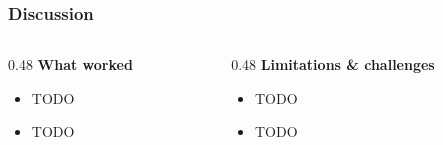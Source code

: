
\begin{frame}
	\frametitle{Discussion}

	\begin{columns}[T]
		\begin{column}{0.48\linewidth}
			\textbf{What worked}
			\begin{itemize}
				\item TODO
				\item TODO
			\end{itemize}
		\end{column}
		\begin{column}{0.48\linewidth}
			\textbf{Limitations \& challenges}
			\begin{itemize}
				\item TODO
				\item TODO
			\end{itemize}
		\end{column}
	\end{columns}
\end{frame}
